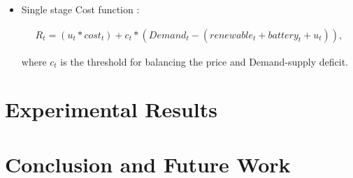 \documentclass[conference]{IEEEtran}
\begin{document}
\begin{itemize}

\item Single stage Cost function : 

\begin{align}
R_t = (u_{t}*cost_{t}) + c_{t}*(Demand_{t} - (renewable_{t}+battery_{t}+u_{t})),
\end{align}

where $c_{t}$ is the threshold for balancing the price and Demand-supply deficit. 

\end{itemize}



\section{Experimental Results}

\section{Conclusion and Future Work}







 
 




\end{document}
